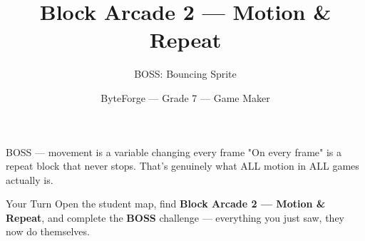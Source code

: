 \documentclass[aspectratio=169]{beamer}
\title{Block Arcade 2 — Motion \& Repeat}
\subtitle{BOSS: Bouncing Sprite}
\author{ByteForge --- Grade 7 --- Game Maker}
\date{}
\begin{document}
\begin{frame}
    \titlepage
\end{frame}

\begin{frame}{BOSS — movement is a variable changing every frame}
    \Large
    "On every frame" is a repeat block that never stops. That's genuinely what ALL motion in ALL games actually is.
\end{frame}

\begin{frame}{Your Turn}
    \Large
    Open the student map, find \textbf{Block Arcade 2 — Motion \& Repeat}, and complete
    the \textbf{BOSS} challenge --- everything you just saw, they now do themselves.
\end{frame}
\end{document}
